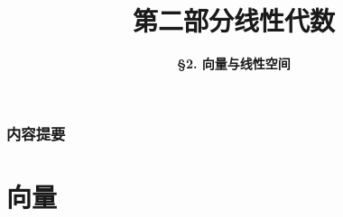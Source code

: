 



\title[Linear Algebra]{\LARGE \bfseries 第二部分\quad 线性代数} %
\author[Vector and Linear Space] %
{\Large \bfseries \S 2. 向量与线性空间}
\date{}






\begin{frame}

\titlepage %

\end{frame}


\begin{frame}
\frametitle{内容提要} %
\tableofcontents %
\end{frame}


\section{向量} %

